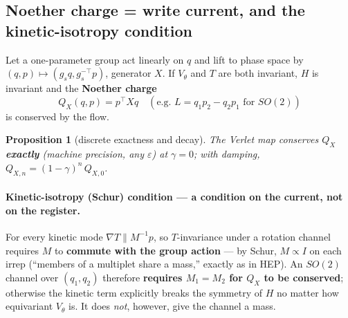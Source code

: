 \documentclass[11pt]{article}
\theoremstyle{plain}
\newtheorem{proposition}{Proposition}
\theoremstyle{definition}
\begin{document}
\subsection{Noether charge = write current, and the kinetic-isotropy condition}
Let a one-parameter group act linearly on $q$ and lift to phase space by $(q,p)\mapsto(g_sq,g_s^{-\top}p)$, generator $X$. If $V_\theta$ and $T$ are both invariant, $H$ is invariant and the \textbf{Noether charge}
\[ Q_X(q,p)=p^\top X q\quad(\text{e.g. }L=q_1p_2-q_2p_1\text{ for }SO(2)) \]
is conserved by the flow.
\begin{proposition}[discrete exactness and decay]\label{prop:noether}
The Verlet map conserves $Q_X$ \textbf{exactly} (machine precision, any $\varepsilon$) at $\gamma=0$; with damping, $Q_{X,n}=(1-\gamma)^n\,Q_{X,0}$.
\end{proposition}
\paragraph{Kinetic-isotropy (Schur) condition --- a condition on the current, not on the register.} For every kinetic mode $\nabla T\parallel M^{-1}p$, so $T$-invariance under a rotation channel requires $M$ to \textbf{commute with the group action} --- by Schur, $M\propto I$ on each irrep (``members of a multiplet share a mass,'' exactly as in HEP). An $SO(2)$ channel over $(q_1,q_2)$ therefore \textbf{requires $M_1=M_2$ for $Q_X$ to be conserved}; otherwise the kinetic term explicitly breaks the symmetry of $H$ no matter how equivariant $V_\theta$ is. It does \emph{not}, however, give the channel a mass.
\end{document}
